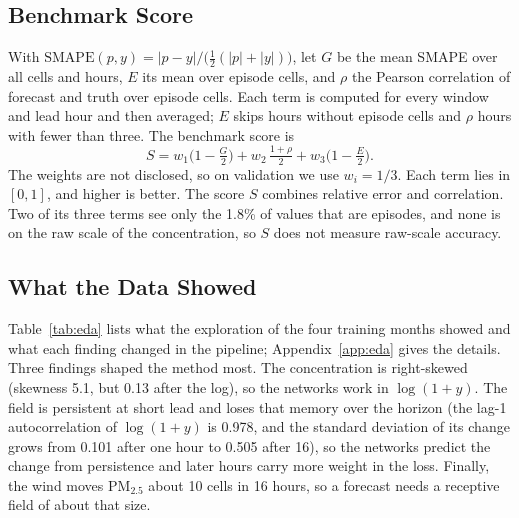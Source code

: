\documentclass[journal]{IEEEtran}
\newcommand{\PM}{PM$_{2.5}$}
\begin{document}
\subsection{Benchmark Score}
\label{sec:score}
With $\mathrm{SMAPE}(p,y)=|p-y|/\bigl(\tfrac12(|p|+|y|)\bigr)$, let $G$ be the mean SMAPE over all cells and hours, $E$ its mean over episode cells, and $\rho$ the Pearson correlation of forecast and truth over episode cells. Each term is computed for every window and lead hour and then averaged; $E$ skips hours without episode cells and $\rho$ hours with fewer than three. The benchmark score is
\begin{equation}
S = w_1\bigl(1-\tfrac{G}{2}\bigr) + w_2\,\tfrac{1+\rho}{2} + w_3\bigl(1-\tfrac{E}{2}\bigr).
\label{eq:score}
\end{equation}
The weights are not disclosed, so on validation we use $w_i=1/3$. Each term lies in $[0,1]$, and higher is better. The score $S$ combines relative error and correlation. Two of its three terms see only the 1.8\% of values that are episodes, and none is on the raw scale of the concentration, so $S$ does not measure raw-scale accuracy.

\subsection{What the Data Showed}
\label{sec:eda}
Table~\ref{tab:eda} lists what the exploration of the four training months showed and what each finding changed in the pipeline; Appendix~\ref{app:eda} gives the details. Three findings shaped the method most. The concentration is right-skewed (skewness 5.1, but 0.13 after the log), so the networks work in $\log(1+y)$. The field is persistent at short lead and loses that memory over the horizon (the lag-1 autocorrelation of $\log(1+y)$ is 0.978, and the standard deviation of its change grows from 0.101 after one hour to 0.505 after 16), so the networks predict the change from persistence and later hours carry more weight in the loss. Finally, the wind moves \PM{} about 10 cells in 16 hours, so a forecast needs a receptive field of about that size.
\end{document}
